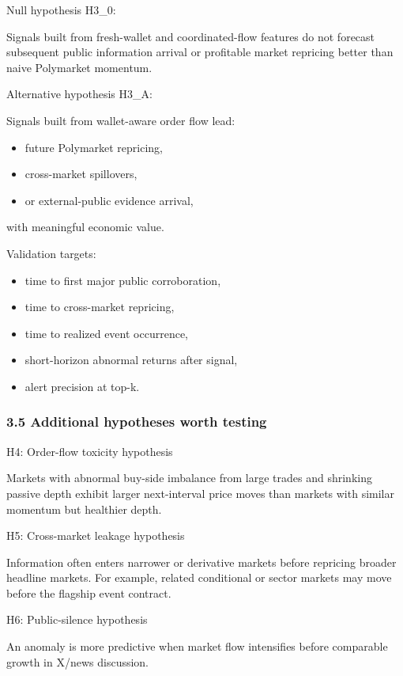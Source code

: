 \documentclass[
]{article}
\providecommand{\tightlist}{%
  \setlength{\itemsep}{0pt}\setlength{\parskip}{0pt}}
\begin{document}
Null hypothesis H3\_0:

Signals built from fresh-wallet and coordinated-flow features do not
forecast subsequent public information arrival or profitable market
repricing better than naive Polymarket momentum.

Alternative hypothesis H3\_A:

Signals built from wallet-aware order flow lead:

\begin{itemize}
\tightlist
\item
  future Polymarket repricing,
\item
  cross-market spillovers,
\item
  or external-public evidence arrival,
\end{itemize}

with meaningful economic value.

Validation targets:

\begin{itemize}
\tightlist
\item
  time to first major public corroboration,
\item
  time to cross-market repricing,
\item
  time to realized event occurrence,
\item
  short-horizon abnormal returns after signal,
\item
  alert precision at top-k.
\end{itemize}

\subsubsection{3.5 Additional hypotheses worth
testing}\label{35-additional-hypotheses-worth-testing}

H4: Order-flow toxicity hypothesis

Markets with abnormal buy-side imbalance from large trades and shrinking
passive depth exhibit larger next-interval price moves than markets with
similar momentum but healthier depth.

H5: Cross-market leakage hypothesis

Information often enters narrower or derivative markets before repricing
broader headline markets. For example, related conditional or sector
markets may move before the flagship event contract.

H6: Public-silence hypothesis

An anomaly is more predictive when market flow intensifies before
comparable growth in X/news discussion.
\end{document}
